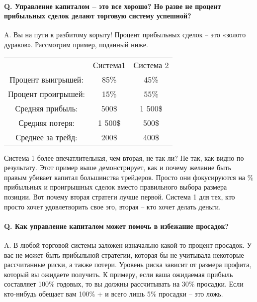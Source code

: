 \documentclass[a5paper]{article}
\begin{document}
\paragraph{Q. Управление капиталом – это все хорошо? Но разве не процент прибыльных сделок делают торговую систему успешной?}

A. Вы на пути к разбитому корыту! Процент прибыльных сделок – это «золото дураков». Рассмотрим пример, поданный ниже.

\begin{tabular}{ccc}
                                            & Система1&                                  Система 2\\

Процент выигрышей:            & 85\%                                             &45\%\\

Процент проигрышей:           &15\%                                              &55\%\\

Средняя прибыль:                &500\$                                             &1 500\$\\

Средняя потеря:                   &1 500\$                                          &500\$\\

Среднее за трейд:                &200\$
                                                      &400\$\\
\end{tabular}

Система 1 более впечатлительная, чем вторая, не так ли? Не так, как
видно по результату. Этот пример выше демонстрирует, как и почему
желание быть правым убивает капитал большинства трейдеров. Просто они
фокусируются на \% прибыльных и проигрышных сделок вместо правильного
                выбора размера позиции. Вот почему вторая стратеги
                лучше первой. Система 1 для тех, кто просто хочет
                удовлетворить свое эго, вторая – кто хочет делать
                деньги.

\paragraph{Q. Как управление капиталом может помочь в избежание просадок?}

A. В любой торговой системы заложен изначально какой-то процент
просадок. У вас не может быть прибыльной стратегии, которая бы не
учитывала некоторые рассчитанные риски, а также потери. Уровень риска
зависит от размера профита, который вы ожидаете получить. К примеру,
если ваша ожидаемая прибыль составляет 100\% годовых, то вы должны
рассчитывать на 30\% просадки. Если кто-нибудь обещает вам 100\% + и
всего лишь 5\% просадки – это ложь.
\end{document}
